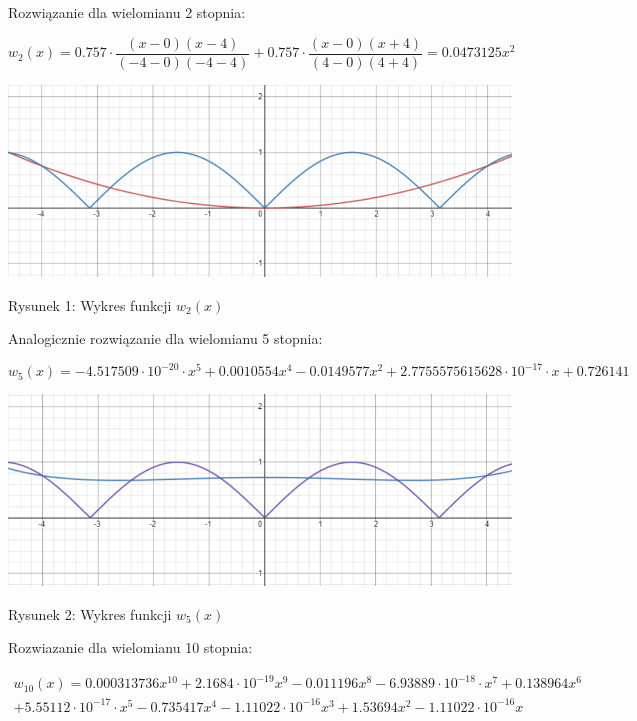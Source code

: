 \documentclass[5]{article}
\begin{document}
Rozwiązanie dla wielomianu 2 stopnia:

\[w_{2}(x)=0.757\cdot \frac{(x-0)(x-4)}{(-4-0)(-4-4)}+0.757\cdot \frac{(x-0)(x+4)}{(4-0)(4+4)}=0.0473125x^{2}\]

\hfil
\includegraphics[scale=0.5]{wielomian2.PNG} \par
\vspace{3mm}
\hfil{Rysunek 1: Wykres funkcji $w_{2}(x)$} \par 

\vspace{5mm}
Analogicznie rozwiązanie dla wielomianu 5 stopnia:

\[w_{5}(x)=-4.517509\cdot 10^{-20}\cdot x^{5}+0.0010554x^{4}-0.0149577x^{2}+2.7755575615628\cdot 10^{-17}\cdot x+0.726141\]

\hfil
\includegraphics[scale=0.5]{wielomian5.PNG} \par
\vspace{3mm}
\hfil{Rysunek 2: Wykres funkcji $w_{5}(x)$} \par

\vspace{5mm}
Rozwiazanie dla wielomianu 10 stopnia:

\begin{multline*}
w_{10}(x) = 0.000313736x^{10} + 2.1684\cdot 10^{-19} x^{9} - 0.011196x^{8} - 6.93889\cdot 10^{-18} \cdot x^{7} + 0.138964 x^{6}\\ 
+ 5.55112\cdot 10^{-17}\cdot x^{5}-0.735417x^{4} - 1.11022\cdot 10^{-16} x^{3} + 1.53694 x^{2} - 1.11022\cdot 10^{-16} x
\end{multline*}
\end{document}
